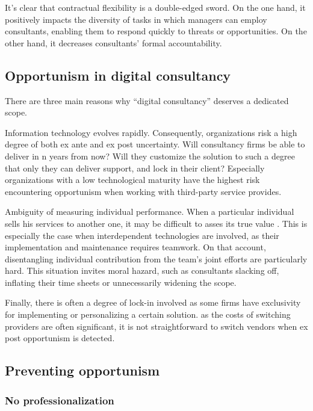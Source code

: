 \documentclass[12pt]{article}
\begin{document}
It's clear that contractual flexibility is a double-edged sword. On the
one hand, it positively impacts the diversity of tasks in which managers
can employ consultants, enabling them to respond quickly to threats or
opportunities. On the other hand, it decreases consultants' formal
accountability.

\subsection{Opportunism in digital
consultancy}\label{opportunism-in-digital-consultancy}

There are three main reasons why ``digital consultancy'' deserves a
dedicated scope.

Information technology evolves rapidly. Consequently, organizations risk
a high degree of both ex ante and ex post uncertainty. Will consultancy
firms be able to deliver in n years from now? Will they customize the
solution to such a degree that only they can deliver support, and lock
in their client? Especially organizations with a low technological
maturity have the highest risk encountering opportunism when working
with third-party service provides.

Ambiguity of measuring individual performance. When a particular
individual sells his services to another one, it may be difficult to
asses its true value \citep[ 134-135]{ouchi1980}. This is especially the
case when interdependent technologies are involved, as their
implementation and maintenance requires teamwork. On that account,
disentangling individual contribution from the team's joint efforts are
particularly hard. This situation invites moral hazard, such as
consultants slacking off, inflating their time sheets or unnecessarily
widening the scope.

Finally, there is often a degree of lock-in involved as some firms have
exclusivity for implementing or personalizing a certain solution. as the
costs of switching providers are often significant, it is not
straightforward to switch vendors when ex post opportunism is detected.

\subsection{Preventing opportunism}\label{preventing-opportunism}

\subsubsection{No professionalization}\label{no-professionalization}
\end{document}

